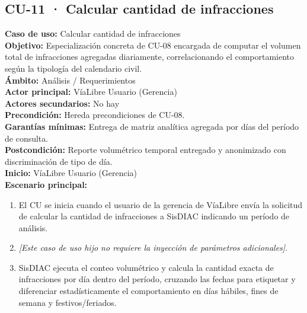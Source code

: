 \documentclass[12pt,letterpaper]{article}
\begin{document}
\newpage
\subsection{CU-11 · Calcular cantidad de infracciones}

\noindent \textbf{Caso de uso:} Calcular cantidad de infracciones \\
\textbf{Objetivo:} Especialización concreta de CU-08 encargada de computar el volumen total de infracciones agregadas diariamente, correlacionando el comportamiento según la tipología del calendario civil. \\
\textbf{Ámbito:} Análisis / Requerimientos \\
\textbf{Actor principal:} VíaLibre Usuario (Gerencia) \\
\textbf{Actores secundarios:} No hay \\
\textbf{Precondición:} Hereda precondiciones de CU-08. \\
\textbf{Garantías mínimas:} Entrega de matriz analítica agregada por días del período de consulta. \\
\textbf{Postcondición:} Reporte volumétrico temporal entregado y anonimizado con discriminación de tipo de día. \\
\textbf{Inicio:} VíaLibre Usuario (Gerencia) \\

\noindent \textbf{Escenario principal:}
\begin{enumerate}[nosep, leftmargin=*]
	\item[1.] El CU se inicia cuando el usuario de la gerencia de VíaLibre envía la solicitud de calcular la cantidad de infracciones a SisDIAC indicando un período de análisis.
	\item[4.] \textit{[Este caso de uso hijo no requiere la inyección de parámetros adicionales]}.
	\item[5.] SisDIAC ejecuta el conteo volumétrico y calcula la cantidad exacta de infracciones por día dentro del período, cruzando las fechas para etiquetar y diferenciar estadísticamente el comportamiento en días hábiles, fines de semana y festivos/feriados.
\end{enumerate}




\newpage
\end{document}
